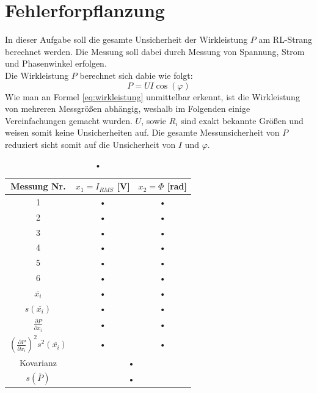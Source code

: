 \section{Fehlerforpflanzung}
In dieser Aufgabe soll die gesamte Unsicherheit der Wirkleistung $P$ am RL-Strang berechnet werden. Die Messung soll dabei durch Messung von Spannung, Strom und Phasenwinkel erfolgen. \\
Die Wirkleistung $P$ berechnet sich dabie wie folgt:
\begin{equation}
	P = UI\cos(\varphi)
	\label{eq:wirkleistung}
\end{equation}
Wie man an Formel \ref{eq:wirkleistung} unmittelbar erkennt, ist die Wirkleistung von mehreren Messgrößen abhängig, weshalb im Folgenden einige Vereinfachungen gemacht wurden. $U$, sowie $R_i$ sind exakt bekannte Größen und weisen somit keine Unsicherheiten auf. Die gesamte Messunsicherheit von $P$ reduziert sicht somit auf die Unsicherheit von $I$ und $\varphi$.
\begin{table}[h]
	\centering
	\begin{tabular}{|c||c|c|}
	\hline 
	Messung Nr. & $x_1 = I_{RMS}$ [V] & $x_2 = \Phi$ [rad] \\ 
	\hline 
	1 & • & • \\ 
	\hline 
	2 & • & • \\ 
	\hline 
	3 & • & • \\ 
	\hline 
	4 & • & • \\ 
	\hline 
	5 & • & • \\ 
	\hline 
	6 & • & • \\ 
	\hline 
	$\overline{x_i}$ & • & • \\ 
	\hline 
	$s(\overline{x_i})$ & • & • \\ 
	\hline 
	$\frac{\partial P}{\partial x_i}$ & • & • \\ 
	\hline 
	$(\frac{\partial P}{\partial x_i})^2 s^2(\overline{x_i})$ & • & • \\ 
	\hline 
	Kovarianz & \multicolumn{2}{c|}{•} \\ 
	\hline 
	$s (\overline{P})$ & \multicolumn{2}{c|}{•} \\ 
	\hline 
	\end{tabular} 
	\caption{•}
\end{table}
